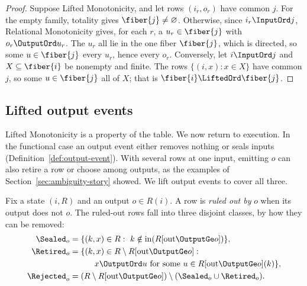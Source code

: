 \begin{proof}
Suppose Lifted Monotonicity, and let rows $(i_r,o_r)$ have common \indesc
$j$.  For the empty family, totality gives $\fiber{j}\neq\varnothing$.
Otherwise, since $i_r\InputOrd j$, Relational Monotonicity gives, for each
$r$, a $u_r\in\fiber{j}$ with $o_r\OutputOrd u_r$.  The $u_r$ all lie in the
one fiber $\fiber{j}$, which is directed, so some $u\in\fiber{j}$ \outrel
every $u_r$, hence every $o_r$.  Conversely, let $i\InputOrd j$ and
$X\subseteq\fiber{i}$ be nonempty and finite.  The rows $\{(i,x):x\in X\}$
have common \indesc $j$, so some $u\in\fiber{j}$ \outrel all of $X$; that is
$\fiber{i}\LiftedOrd\fiber{j}$.
\end{proof}

\subsection{Lifted output events}
\label{sec:safe-exposure}

Lifted Monotonicity is a property of the table.  We now return to execution.
In the functional case an output event either removes nothing or seals inputs
(Definition~\ref{def:output-event}).  With several rows at one input, emitting
$o$ can also retire a \outrelpast row or choose among outputs, as the examples
of Section~\ref{sec:ambiguity-story} showed.  We lift output events to cover
all three.

Fix a state $(i,R)$ and an output $o\in R(i)$.  A row is \emph{ruled out by}
$o$ when its output does not \outrelbase $o$.  The ruled-out rows fall into
three disjoint classes, by how they can be removed:
\begin{align}
  \Sealed_o&=\{(k,x)\in R:\ k\notin\mathrm{in}(R[\mathrm{out}\OutputGe o])\},
      \label{eq:seal-inputs}\\
  \Retired_o&=\{(k,x)\in R\setminus R[\mathrm{out}\OutputGe o]:\notag\\
    &\qquad\quad x\OutputOrd u\text{ for some }u\in R[\mathrm{out}\OutputGe o](k)\},
      \label{eq:output-retirements}\\
  \Rejected_o&=(R\setminus R[\mathrm{out}\OutputGe o])
       \setminus(\Sealed_o\cup\Retired_o).
      \label{eq:choice-removals}
\end{align}

